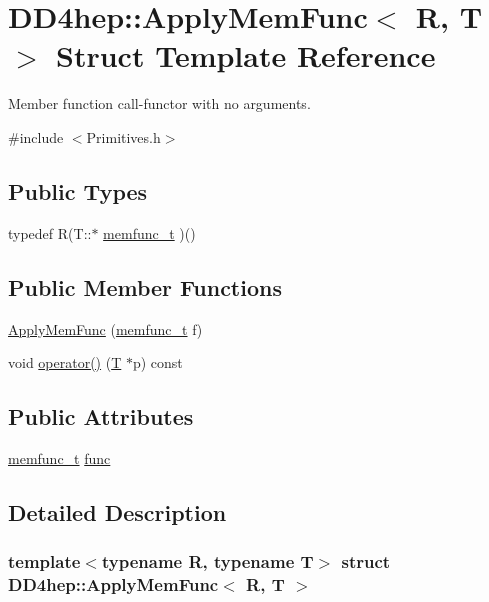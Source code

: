 \hypertarget{struct_d_d4hep_1_1_apply_mem_func}{
\section{DD4hep::ApplyMemFunc$<$ R, T $>$ Struct Template Reference}
\label{struct_d_d4hep_1_1_apply_mem_func}
}


Member function call-\/functor with no arguments.  


{\ttfamily \#include $<$Primitives.h$>$}\subsection*{Public Types}
\begin{DoxyCompactItemize}
\item 
typedef R(T::$\ast$ \hyperlink{struct_d_d4hep_1_1_apply_mem_func_a6389bc0d8232dcc89a3c8162471bb439}{memfunc\_\-t} )()
\end{DoxyCompactItemize}
\subsection*{Public Member Functions}
\begin{DoxyCompactItemize}
\item 
\hyperlink{struct_d_d4hep_1_1_apply_mem_func_a6bf11f21888593fa22e7c4a354b9f965}{ApplyMemFunc} (\hyperlink{struct_d_d4hep_1_1_apply_mem_func_a6389bc0d8232dcc89a3c8162471bb439}{memfunc\_\-t} f)
\item 
void \hyperlink{struct_d_d4hep_1_1_apply_mem_func_a1939b3550b041b84c2a1b6880362b6be}{operator()} (\hyperlink{class_t}{T} $\ast$p) const 
\end{DoxyCompactItemize}
\subsection*{Public Attributes}
\begin{DoxyCompactItemize}
\item 
\hyperlink{struct_d_d4hep_1_1_apply_mem_func_a6389bc0d8232dcc89a3c8162471bb439}{memfunc\_\-t} \hyperlink{struct_d_d4hep_1_1_apply_mem_func_a9cb93a8dbd712d6daf163e4b46992bf4}{func}
\end{DoxyCompactItemize}


\subsection{Detailed Description}
\subsubsection*{template$<$typename R, typename T$>$ struct DD4hep::ApplyMemFunc$<$ R, T $>$}

